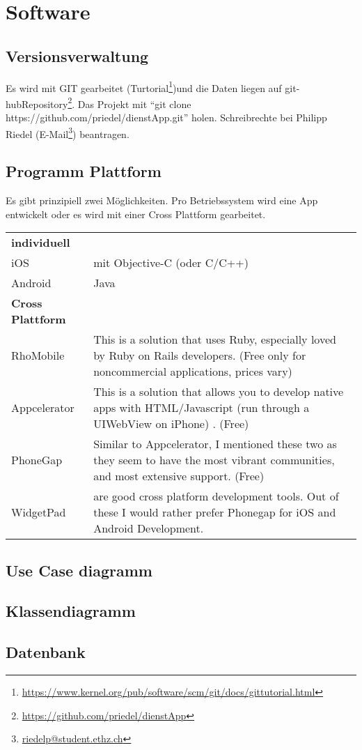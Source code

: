 \section{Software}

\subsection{Versionsverwaltung}
Es wird mit GIT gearbeitet (Turtorial\footnote{\url{https://www.kernel.org/pub/software/scm/git/docs/gittutorial.html}})und die Daten liegen auf git-hub{Repository\footnote{\url{https://github.com/priedel/dienstApp}}}. Das Projekt mit \enquote{git clone https://github.com/priedel/dienstApp.git} holen.
 Schreibrechte bei Philipp Riedel (E-Mail\footnote{\href{mailto:riedelp@student.ethz.ch}{riedelp@student.ethz.ch}}) beantragen.

\subsection{Programm Plattform}

Es gibt prinzipiell zwei Möglichkeiten. Pro Betriebssystem wird eine App entwickelt oder es wird mit einer Cross Plattform gearbeitet\cite{appEinf}.


\begin{tabularx}{\textwidth}{lX}
\textbf{individuell}\cite{appEinf}&\\
iOS & mit  Objective-C (oder C/C++)\\
Android & Java \\
\textbf{Cross Plattform}\cite{crossPlat}&\\
    RhoMobile & This is a solution that uses Ruby, especially loved by Ruby on Rails developers. (Free only for noncommercial applications, prices vary)\\
    Appcelerator & This is a solution that allows you to develop native apps with HTML/Javascript (run through a UIWebView on iPhone) . (Free)\\
    PhoneGap & Similar to Appcelerator, I mentioned these two as they seem to have the most vibrant communities, and most extensive support. (Free)\\
    WidgetPad & are good cross platform development tools. Out of these I would rather prefer Phonegap for iOS and Android Development.\\
\end{tabularx}
\centering{{$\vdots$}}

\subsection{Use Case diagramm}
\subsection{Klassendiagramm}

\subsection{Datenbank}

